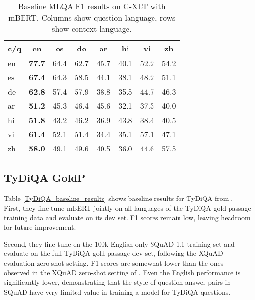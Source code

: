 \documentclass[11pt]{article}
\begin{document}
\begin{table}[ht]
\centering
\begin{adjustbox}{max width=\columnwidth}
\begin{tabular}{l|ccccccc}
\toprule
c/q & en   & es   & de   & ar   & hi   & vi   & zh   \\ \midrule
en  & \underline{\textbf{77.7}} & \underline{64.4} & \underline{62.7} & \underline{45.7} & 40.1 & 52.2 & 54.2 \\
es  & \textbf{67.4} & 64.3 & 58.5 & 44.1 & 38.1 & 48.2 & 51.1 \\
de  & \textbf{62.8} & 57.4 & 57.9 & 38.8 & 35.5 & 44.7 & 46.3 \\
ar  & \textbf{51.2} & 45.3 & 46.4 & 45.6 & 32.1 & 37.3 & 40.0 \\
hi  & \textbf{51.8} & 43.2 & 46.2 & 36.9 & \underline{43.8} & 38.4 & 40.5 \\
vi  & \textbf{61.4} & 52.1 & 51.4 & 34.4 & 35.1 & \underline{57.1} & 47.1 \\
zh  & \textbf{58.0} & 49.1 & 49.6 & 40.5 & 36.0 & 44.6 & \underline{57.5} \\ \bottomrule
\end{tabular}
\end{adjustbox}
\caption{Baseline MLQA F1 results on G-XLT with mBERT. Columns show question language, rows show context language.}
\label{tab:mlqa_zero-shot_baseline_mbert}
\end{table}

\subsection{TyDiQA GoldP}

Table \ref{TyDiQA_baseline_results} shows baseline results for TyDiQA from \citet{tydiqa}. First, they fine tune mBERT jointly on all languages of the TyDiQA gold passage training data and evaluate on its dev set. F1 scores remain low, leaving headroom for future improvement.

Second, they fine tune on the 100k English-only SQuAD 1.1 training set and evaluate on the full TyDiQA gold passage dev set, following the XQuAD evaluation zero-shot setting. F1 scores are somewhat lower than the ones observed in the XQuAD zero-shot setting of \citet{Artetxe:etal:2019}. Even the English performance is significantly lower, demonstrating that the style of question-answer pairs in SQuAD have very limited value in training a model for TyDiQA questions.
\end{document}
